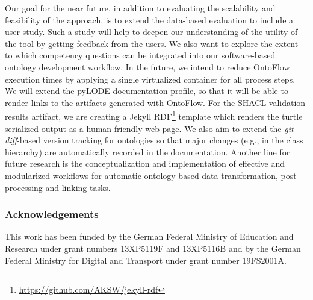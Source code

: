 \documentclass[runningheads]{llncs}
\begin{document}
Our goal for the near future, in addition to evaluating the scalability and feasibility of the approach, is to extend the data-based evaluation to include a user study. Such a study will help to deepen our understanding of the utility of the tool by getting feedback from the users. We also want to explore the extent to which competency questions can be integrated into our software-based ontology development workflow.
In the future, we intend to reduce OntoFlow execution times by applying a single virtualized container for all process steps.
We will extend the pyLODE documentation profile, so that it will be able to render links to the artifacts generated with OntoFlow. For the SHACL validation results artifact, we are creating a Jekyll RDF\footnote{\url{https://github.com/AKSW/jekyll-rdf}} template which renders the turtle serialized output as a human friendly web page.
We also aim to extend the \textit{git diff}-based version tracking for ontologies so that major changes (e.g., in the class hierarchy) are automatically recorded in the documentation. Another line for future research is the conceptualization and implementation of effective and modularized workflows for automatic ontology-based data transformation, post-processing and linking tasks.

%
%
% 
% 



%
%
\subsubsection*{Acknowledgements}

This work has been funded by the German Federal Ministry of Education and Research under grant numbers 13XP5119F and 13XP5116B and by the German Federal Ministry for Digital and Transport under grant number 19FS2001A.
\end{document}
